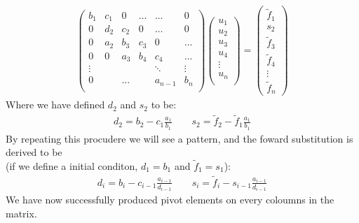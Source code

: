 \documentclass[a4paper, 10pt]{article}
\begin{document}
\begin{align}
  \begin{pmatrix}
    b_{1} & c_1 & 0 & \ldots &  \ldots & 0\\
    0 & d_{2} & c_2  & 0 & \ldots & 0\\
    0 & a_2 & b_3 &c_3 & 0 & \ldots \\
    0 & 0 & a_3 & b_4 &c_4 &\ldots\\
    \vdots &  & &  &\ddots & \vdots \\
    0 && \ldots && a_{n-1}&  b_n  \\
  \end{pmatrix}\begin{pmatrix}
    u_1\\
    u_2\\
    u_3\\
    u_4\\
    \vdots\\
    u_n\\
  \end{pmatrix}=
  \begin{pmatrix}
    \tilde{f}_{1}\\
    s_2\\
    \tilde{f}_{3}\\
    \tilde{f}_{4}\\
    \vdots\\
    \tilde{f}_{n}
  \end{pmatrix}
\end{align}
Where we have defined $d_{2}$ and $s_{2}$ to be:
\begin{align}
  d_{2} = b_{2} - c_{1}\frac{a_{1}}{b_{1}} \qquad s_{2} = \tilde{f}_{2} - \tilde{f}_{1}\frac{a_{1}}{b_{1}}
\end{align}
By repeating this procudere we will see a pattern, and the foward substitution is
derived to be\\ (if we define a initial conditon, $d_{1} = b_{1}$ and $\tilde{f}_{1} = s_{1}$):
\begin{align}
  d_{i} = b_{i} - c_{i-1}\frac{a_{i-1}}{d_{i-1}}
  \qquad
  s_{i} = \tilde{f}_{i} - s_{i-1}\frac{a_{i-1}}{d_{i-1}}
\end{align}
We have now successfully produced pivot elements
on every coloumns in the matrix.
\end{document}
